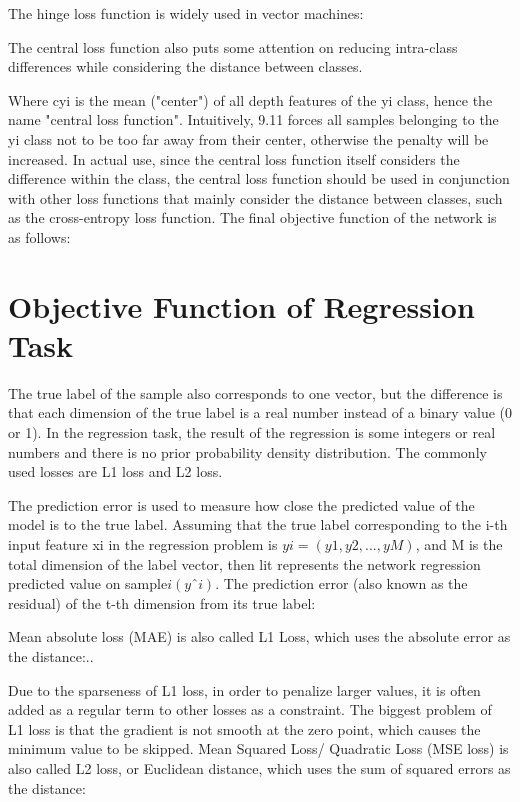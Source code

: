The hinge loss function is widely used in vector machines:

The central loss function also puts some attention on reducing intra-class differences while considering the distance between classes.

Where cyi is the mean ("center") of all depth features of the yi class, hence the name "central loss function". Intuitively, 9.11 forces all samples belonging to the yi class not to be too far away from their center, otherwise the penalty will be increased. In actual use, since the central loss function itself considers the difference within the class, the central loss function should be used in conjunction with other loss functions that mainly consider the distance between classes, such as the cross-entropy loss function. The final objective function of the network is as follows:

\section{Objective Function of Regression Task}
\label{cha:training/loss function/objective function of regression task}

The true label of the sample also corresponds to one vector, but the difference is that each dimension of the true label is a real number instead of a binary value (0 or 1). In the regression task, the result of the regression is some integers or real numbers and there is no prior probability density distribution. The commonly used losses are L1 loss and L2 loss.

The prediction error is used to measure how close the predicted value of the model is to the true label. Assuming that the true label corresponding to the i-th input feature xi in the regression problem is $yi = (y1, y2,...,yM)$, and M is the total dimension of the label vector, then lit represents the network regression predicted value on sample$ i ( yˆi)$. The prediction error (also known as the residual) of the t-th dimension from its true label:

Mean absolute loss (MAE) is also called L1 Loss, which uses the absolute error as the distance:..

Due to the sparseness of L1 loss, in order to penalize larger values, it is often added as a regular term to other losses as a constraint. The biggest problem of L1 loss is that the gradient is not smooth at the zero point, which causes the minimum value to be skipped.
Mean Squared Loss/ Quadratic Loss (MSE loss) is also called L2 loss, or Euclidean distance, which uses the sum of squared errors as the distance:

